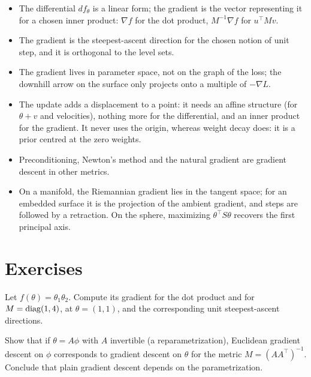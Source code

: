 \begin{notechapter}
\begin{chaptersummary}
\begin{itemize}[nosep]
  \item The differential $df_\theta$ is a linear form; the gradient is the vector representing it for a chosen
        inner product: $\nabla f$ for the dot product, $M^{-1}\nabla f$ for $u^\top Mv$.
  \item The gradient is the steepest-ascent direction for the chosen notion of unit step, and it is
        orthogonal to the level sets.
  \item The gradient lives in parameter space, not on the graph of the loss; the downhill arrow on
        the surface only projects onto a multiple of $-\nabla L$.
  \item The update adds a displacement to a point: it needs an affine structure (for $\theta + v$ and
        velocities), nothing more for the differential, and an inner product for the gradient. It
        never uses the origin, whereas weight decay does: it is a prior centred at the zero weights.
  \item Preconditioning, Newton's method and the natural gradient are gradient descent in other
        metrics.
  \item On a manifold, the Riemannian gradient lies in the tangent space; for an embedded surface it
        is the projection of the ambient gradient, and steps are followed by a retraction. On the sphere,
        maximizing $\theta^\top S\theta$ recovers the first principal axis.
\end{itemize}
\end{chaptersummary}

\section*{Exercises}

\begin{exercise}\label{gradient-tangent-space:exr:1}
Let $f(\theta) = \theta_1\theta_2$. Compute its gradient for the dot product and for $M = \operatorname{diag}(1, 4)$, at
$\theta = (1,1)$, and the corresponding unit steepest-ascent directions.
\end{exercise}

\begin{exercise}\label{gradient-tangent-space:exr:2}
Show that if $\theta = A\phi$ with $A$ invertible (a reparametrization), Euclidean gradient descent on $\phi$
corresponds to gradient descent on $\theta$ for the metric $M = (AA^\top)^{-1}$. Conclude that plain gradient
descent depends on the parametrization.
\end{exercise}


\end{notechapter}
